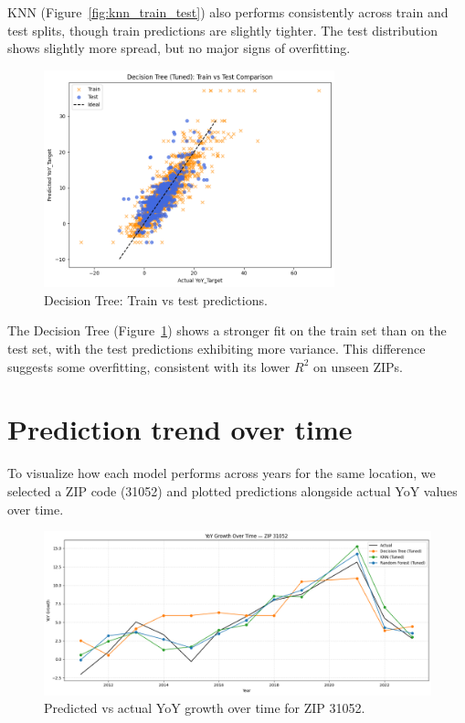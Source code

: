 KNN (Figure~\ref{fig:knn_train_test}) also performs consistently across train and test splits, though train predictions are slightly tighter. The test distribution shows slightly more spread, but no major signs of overfitting.

\begin{figure}[!ht]
    \centering
    \includegraphics[width=0.75\textwidth]{figures/DT2.png}
    \caption{Decision Tree: Train vs test predictions.}
    \label{fig:dt_train_test}
\end{figure}
\FloatBarrier

The Decision Tree (Figure~\ref{fig:dt_train_test}) shows a stronger fit on the train set than on the test set, with the test predictions exhibiting more variance. This difference suggests some overfitting, consistent with its lower $R^2$ on unseen ZIPs.

\section{Prediction trend over time}

To visualize how each model performs across years for the same location, we selected a ZIP code (31052) and plotted predictions alongside actual YoY values over time.

\begin{figure}[!ht]
    \centering
    \includegraphics[width=\textwidth]{figures/testpred.png}
    \caption{Predicted vs actual YoY growth over time for ZIP 31052.}
    \label{fig:testpred_zip}
\end{figure}
\FloatBarrier

